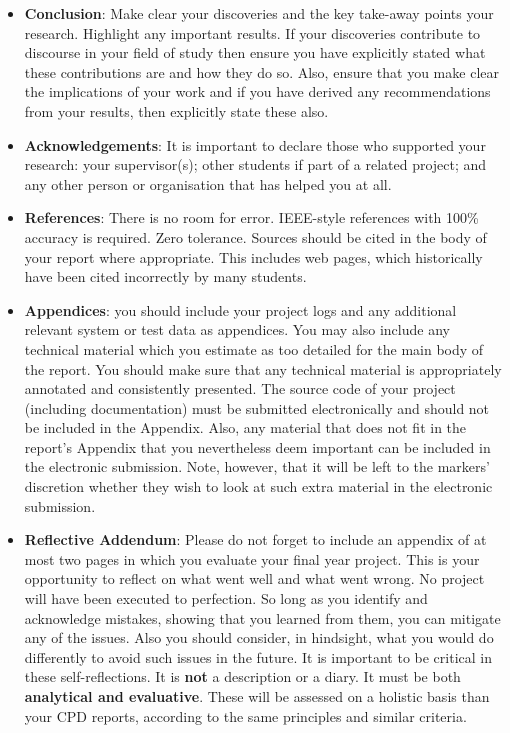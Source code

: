 \begin{itemize}
\item \textbf{Conclusion}: Make clear your discoveries and the key take-away points your research. Highlight any important results. If your discoveries contribute to discourse in your field of study then ensure you have explicitly stated what these contributions are and how they do so. Also, ensure that you make clear the implications of your work and if you have derived any recommendations from your results, then explicitly state these also. 

\item \textbf{Acknowledgements}: It is important to declare those who supported your research: your supervisor(s); other students if part of a related project; and any other person or organisation that has helped you at all.

\item \textbf{References}: There is no room for error. IEEE-style references with 100\% accuracy is required. Zero tolerance. Sources should be cited in the body of your report where appropriate. This includes web pages, which historically have been cited incorrectly by many students.

\item \textbf{Appendices}: you should include your project logs and any additional relevant system or test data as appendices. You may also include any technical material which you estimate as too detailed for the main body of the report. You should make sure that any technical material is appropriately annotated and consistently presented. The source code of your project (including documentation) must be submitted electronically and should not be included in the Appendix. Also, any material that does not fit in the report's Appendix that you nevertheless deem important can be included in the electronic submission. Note, however, that it will be left to the markers' discretion whether they wish to look at such extra material in the electronic submission.

\item \textbf{Reflective Addendum}: Please do not forget to include an appendix of at most two pages in which you evaluate your final year project. This is your opportunity to reflect on what went well and what went wrong. No project will have been executed to perfection. So long as you identify and acknowledge mistakes, showing that you learned from them, you can mitigate any of the issues. Also you should consider, in hindsight, what you would do differently to avoid such issues in the future. It is important to be critical in these self-reflections. It is \textbf{not} a description or a diary. It must be both \textbf{analytical and evaluative}. These will be assessed on a holistic basis than your CPD reports, according to the same principles and similar criteria. 

\end{itemize}

